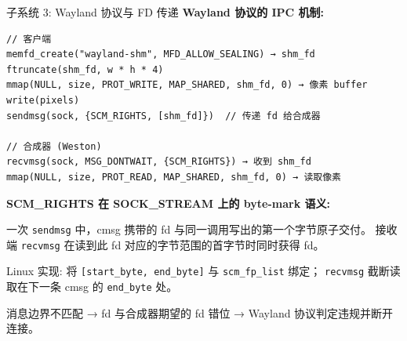 \documentclass[aspectratio=169,10pt]{ctexbeamer}
\newcommand{\syscall}[1]{\texttt{#1}}
\begin{document}

\begin{frame}[fragile,shrink=40]{子系统 3: Wayland 协议与 FD 传递}
\textbf{Wayland 协议的 IPC 机制:}

\begin{verbatim}
// 客户端
memfd_create("wayland-shm", MFD_ALLOW_SEALING) → shm_fd
ftruncate(shm_fd, w * h * 4)
mmap(NULL, size, PROT_WRITE, MAP_SHARED, shm_fd, 0) → 像素 buffer
write(pixels)
sendmsg(sock, {SCM_RIGHTS, [shm_fd]})  // 传递 fd 给合成器

// 合成器 (Weston)
recvmsg(sock, MSG_DONTWAIT, {SCM_RIGHTS}) → 收到 shm_fd
mmap(NULL, size, PROT_READ, MAP_SHARED, shm_fd, 0) → 读取像素
\end{verbatim}

\vspace{1mm}
\textbf{SCM\_RIGHTS 在 SOCK\_STREAM 上的 byte-mark 语义:}

一次 \syscall{sendmsg} 中，cmsg 携带的 fd 与同一调用写出的第一个字节原子交付。
接收端 \syscall{recvmsg} 在读到此 fd 对应的字节范围的首字节时同时获得 fd。

Linux 实现: 将 \texttt{[start\_byte, end\_byte]} 与 \texttt{scm\_fp\_list} 绑定；
\texttt{recvmsg} 截断读取在下一条 cmsg 的 \texttt{end\_byte} 处。

消息边界不匹配 → fd 与合成器期望的 fd 错位 → Wayland 协议判定违规并断开连接。
\end{frame}

\end{document}
